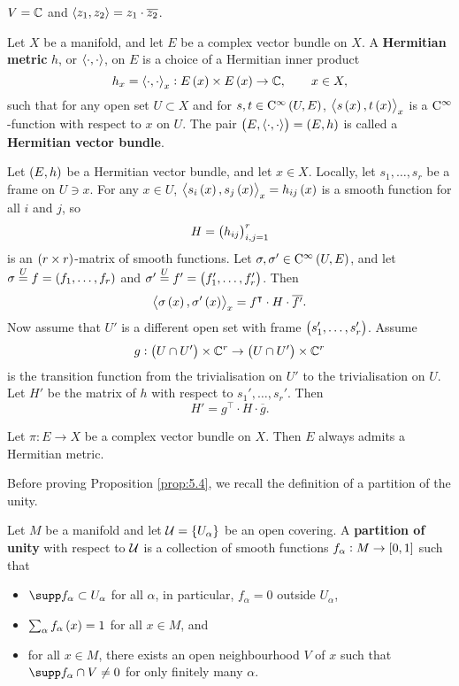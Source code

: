 \begin{example*}
$ V = \mathbb{C} $ and $ \left\langle z_1, z_2 \right\rangle = z_1 \cdot \overline{z_2} $.
\end{example*}

\pagebreak

\begin{definition}
Let $ X $ be a manifold, and let $ E $ be a complex vector bundle on $ X $. A \textbf{Hermitian metric} $ h $, or $ \left\langle \cdot, \cdot \right\rangle $, on $ E $ is a choice of a Hermitian inner product
$$ h_x = \abr{\cdot, \cdot}_x : E\br{x} \times E\br{x} \to \CC, \qquad x \in X, $$
such that for any open set $ U \subset X $ and for $ s, t \in \C^\infty\br{U, E} $, $ \abr{s\br{x}, t\br{x}}_x $ is a $ \mathrm{C}^\infty $-function with respect to $ x $ on $ U $. The pair $ \br{E, \abr{\cdot, \cdot}} = \br{E, h} $ is called a \textbf{Hermitian vector bundle}.
\end{definition}

Let $ \br{E, h} $ be a Hermitian vector bundle, and let $ x \in X $. Locally, let $ s_1, \dots, s_r $ be a frame on $ U \ni x $. For any $ x \in U $, $ \abr{s_i\br{x}, s_j\br{x}}_x = h_{ij}\br{x} $ is a smooth function for all $ i $ and $ j $, so
$$ H = \br{h_{ij}}_{i, j = 1}^r $$
is an $ \br{r \times r} $-matrix of smooth functions. Let $ \sigma, \sigma' \in \C^\infty\br{U, E} $, and let $ \sigma \overset{U}{=} f = \br{f_1, \dots, f_r} $ and $ \sigma' \overset{U}{=} f' = \br{f_1', \dots, f_r'} $. Then
$$ \abr{\sigma\br{x}, \sigma'\br{x}}_x = f^\intercal \cdot H \cdot \overline{f'}. $$
Now assume that $ U' $ is a different open set with frame $ \br{s_1', \dots, s_r'} $. Assume
$$ g : \br{U \cap U'} \times \CC^r \to \br{U \cap U'} \times \CC^r $$
is the transition function from the trivialisation on $ U' $ to the trivialisation on $ U $. Let $ H' $ be the matrix of $ h $ with respect to $ s_1', \dots, s_r' $. Then
$$ H' = g^\intercal \cdot H \cdot \overline{g}. $$

\begin{proposition}
\label{prop:5.4}
Let $ \pi : E \to X $ be a complex vector bundle on $ X $. Then $ E $ always admits a Hermitian metric.
\end{proposition}

Before proving Proposition \ref{prop:5.4}, we recall the definition of a partition of the unity.

\begin{definition}
Let $ M $ be a manifold and let $ \UUU = \cbr{U_\alpha} $ be an open covering. A \textbf{partition of unity} with respect to $ \mathcal{U} $ is a collection of smooth functions $ f_\alpha : M \to \sbr{0, 1} $ such that
\begin{itemize}
\item $ \supp f_\alpha \subset U_\alpha $ for all $ \alpha $, in particular, $ f_\alpha = 0 $ outside $ U_\alpha $,
\item $ \sum_\alpha f_\alpha\br{x} = 1 $ for all $ x \in M $, and
\item for all $ x \in M $, there exists an open neighbourhood $ V $ of $ x $ such that $ \supp f_\alpha \cap V \ne 0 $ for only finitely many $ \alpha $.
\end{itemize}
\end{definition}

